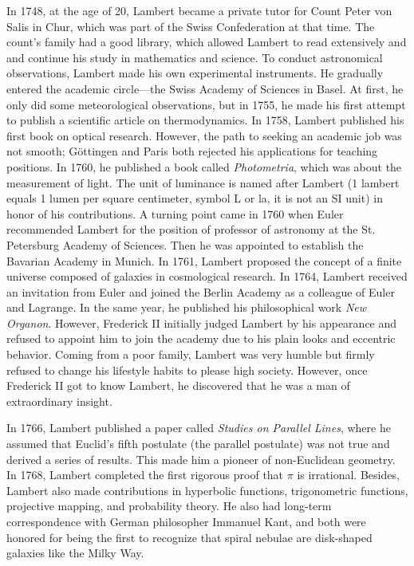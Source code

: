 \documentclass[b5paper]{article}
\begin{document}
\begin{mdframed}
In 1748, at the age of 20, Lambert became a private tutor for Count Peter von Salis in Chur, which was part of the Swiss Confederation at that time. The count's family had a good library, which allowed Lambert to read extensively and and continue his study in mathematics and science. To conduct astronomical observations, Lambert made his own experimental instruments. He gradually entered the academic circle—the Swiss Academy of Sciences in Basel. At first, he only did some meteorological observations, but in 1755, he made his first attempt to publish a scientific article on thermodynamics. In 1758, Lambert published his first book on optical research. However, the path to seeking an academic job was not smooth; Göttingen and Paris both rejected his applications for teaching positions. In 1760, he published a book called \emph{Photometria}, which was about the measurement of light. The unit of luminance is named after Lambert (1 lambert equals 1 lumen per square centimeter, symbol L or la, it is not an SI unit) in honor of his contributions. A turning point came in 1760 when Euler recommended Lambert for the position of professor of astronomy at the St. Petersburg Academy of Sciences. Then he was appointed to establish the Bavarian Academy in Munich. In 1761, Lambert proposed the concept of a finite universe composed of galaxies in cosmological research. In 1764, Lambert received an invitation from Euler and joined the Berlin Academy as a colleague of Euler and Lagrange. In the same year, he published his philosophical work \emph{New Organon}. However, Frederick II initially judged Lambert by his appearance and refused to appoint him to join the academy due to his plain looks and eccentric behavior. Coming from a poor family, Lambert was very humble but firmly refused to change his lifestyle habits to please high society. However, once Frederick II got to know Lambert, he discovered that he was a man of extraordinary insight.

In 1766, Lambert published a paper called \emph{Studies on Parallel Lines}, where he assumed that Euclid's fifth postulate (the parallel postulate) was not true and derived a series of results. This made him a pioneer of non-Euclidean geometry. In 1768, Lambert completed the first rigorous proof that $\pi$ is irrational. Besides, Lambert also made contributions in hyperbolic functions, trigonometric functions, projective mapping, and probability theory. He also had long-term correspondence with German philosopher Immanuel Kant, and both were honored for being the first to recognize that spiral nebulae are disk-shaped galaxies like the Milky Way.
\end{mdframed}
\end{document}
